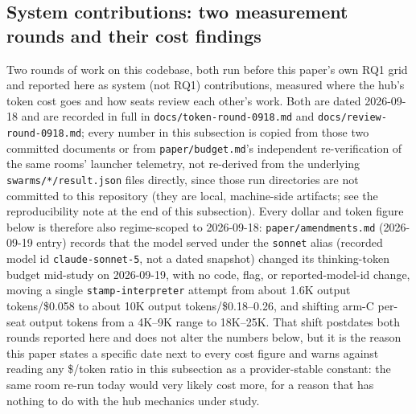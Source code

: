 \subsection{System contributions: two measurement rounds and their cost findings}
\label{sec:system-cost}

Two rounds of work on this codebase, both run before this paper's own RQ1 grid and
reported here as system (not RQ1) contributions, measured where the hub's token cost
goes and how seats review each other's work. Both are dated 2026-09-18 and are recorded
in full in \texttt{docs/token-round-0918.md} and \texttt{docs/review-round-0918.md}; every
number in this subsection is copied from those two committed documents or from
\texttt{paper/budget.md}'s independent re-verification of the same rooms' launcher
telemetry, not re-derived from the underlying \texttt{swarms/*/result.json} files
directly, since those run directories are not committed to this repository (they are
local, machine-side artifacts; see the reproducibility note at the end of this
subsection). Every dollar and token figure below is therefore also regime-scoped to
2026-09-18: \texttt{paper/amendments.md} (2026-09-19 entry) records that the model
served under the \texttt{sonnet} alias (recorded model id \texttt{claude-sonnet-5}, not
a dated snapshot) changed its thinking-token budget mid-study on 2026-09-19, with no
code, flag, or reported-model-id change, moving a
single \texttt{stamp-interpreter} attempt from about 1.6K output tokens/\$0.058 to about
10K output tokens/\$0.18--0.26, and shifting arm-C per-seat output tokens from a 4K--9K
range to 18K--25K. That shift postdates both rounds reported here and does not alter the
numbers below, but it is the reason this paper states a specific date next to every cost
figure and warns against reading any \$/token ratio in this subsection as a
provider-stable constant: the same room re-run today would very likely cost more, for a
reason that has nothing to do with the hub mechanics under study.

